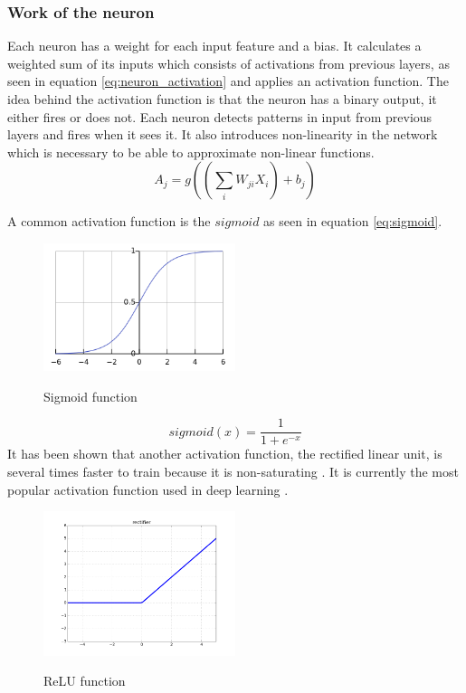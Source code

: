 \documentclass{kththesis}
\begin{document}
\subsubsection{Work of the neuron}
Each neuron  has a weight for each input feature and a bias. It calculates a weighted sum of its inputs which consists of activations from previous layers, as seen in equation \ref{eq:neuron_activation} and applies an activation function. The idea behind the activation function is that the neuron  has a binary output, it either fires or does not. Each neuron detects  patterns  in  input from previous layers and fires when it sees it.  It  also introduces non-linearity in the network which is necessary to be able to approximate non-linear functions.
\begin{equation}
\label{eq:neuron_activation}
A_{j}=g((\sum_{i}W_{ji}X_{i})+b_j)
\end{equation}


A common activation function is the $sigmoid$ as seen in equation \ref{eq:sigmoid}. 

\begin{figure}
\centering
\includegraphics[width=0.5\textwidth]{images/sigmoid.png}
\label{fig:sigmoid}
\caption{Sigmoid function}
\end{figure}

\begin{equation}
\label{eq:sigmoid}
sigmoid(x)=\frac{1}{1+e^{-x}}
\end{equation}
It has been shown that another activation function, the rectified linear unit, is several times faster to train because it is non-saturating \cite{krizhevsky2012imagenet}. It is currently the most popular activation function used  in deep learning \cite{lecun2015deep}.

\begin{figure}
\centering
\includegraphics[width=0.5\textwidth]{images/relu.png}
\label{fig:relu}
\caption{ReLU function}
\end{figure}
\end{document}
